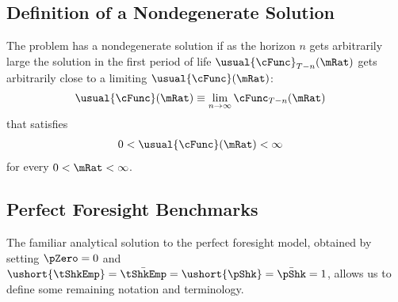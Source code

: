 \documentclass[BufferStockTheory]{subfiles}
\begin{document}
\hypertarget{Definition-of-a-Nondegenerate-Solution}{}
\subsection{Definition of a Nondegenerate Solution}

The problem has a nondegenerate solution if as the horizon $n$ gets arbitrarily large the solution in the first period of life $\usual{\cFunc}_{T-n}(\mRat)$ gets arbitrarily close to a limiting $\usual{\cFunc}(\mRat)$:
\begin{align}
  \usual{\cFunc}(\mRat)  & \equiv  \lim_{n \rightarrow \infty} \cFunc_{T-n}(\mRat)
\end{align}
that satisfies
\begin{align}
  0 & < \usual{\cFunc}(\mRat) <  \infty
\end{align}
for every $0 < \mRat < \infty$.%

\hypertarget{Perfect-Foresight-Benchmarks}{}
\subsection{Perfect Foresight Benchmarks}

The familiar analytical solution to the perfect foresight model, obtained by setting $\pZero=0$ and $\ushort{\tShkEmp}=\bar{\tShkEmp}=\ushort{\pShk}=\bar{\pShk}=1$, allows us to define some remaining notation and terminology.

\hypertarget{Human-Wealth}{}
\end{document}
